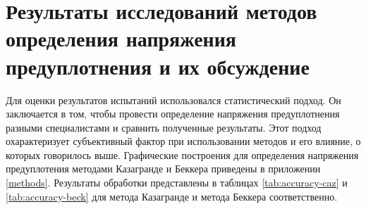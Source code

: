 \chapter{Результаты исследований методов определения напряжения предуплотнения и их обсуждение}


Для оценки результатов испытаний использовался статистический подход.
Он заключается в том, чтобы провести определение напряжения предуплотнения разными специалистами и сравнить полученные результаты.
Этот подход охарактеризует субъективный фактор при использовании методов и его влияние, о которых говорилось выше.
Графические построения для определения напряжения предуплотения методами Казагранде и Беккера приведены в приложении \ref{methods}.
Результаты обработки представлены в таблицах \ref{tab:accuracy-caz} и \ref{tab:accuracy-beck} для метода Казагранде и метода Беккера соответственно.


